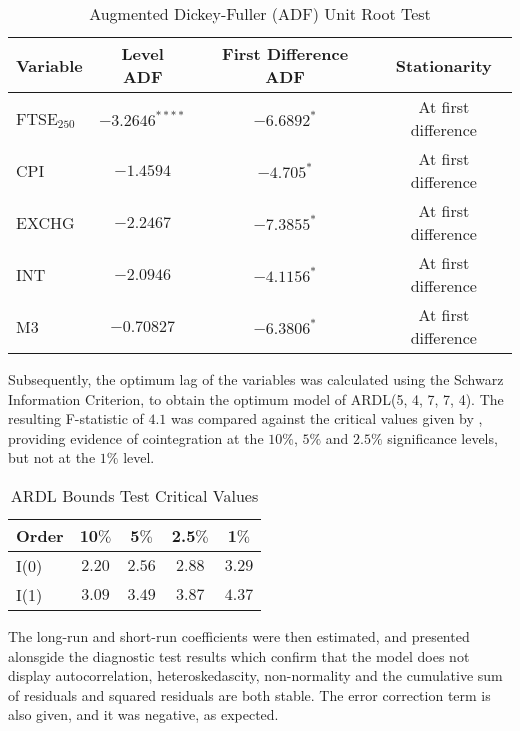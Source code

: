 \documentclass[11pt,a4paper]{article}
\newcommand{\citeboth}[1]{\citeauthor{#1} \citep{#1}}
\begin{document}
\begin{table}[h!]
    \centering
    \caption{Augmented Dickey-Fuller (ADF) Unit Root Test}
    \begin{tabular}{lccc}
        \toprule
        \textbf{Variable} & \textbf{Level ADF} & \textbf{First Difference ADF} & \textbf{Stationarity} \\
        \midrule
        FTSE$_{250}$ & $-3.2646^{****}$ & $-6.6892^{*}$ & At first difference \\
        CPI          & $-1.4594$ & $-4.705^{*}$ & At first difference \\
        EXCHG        & $-2.2467$ & $-7.3855^{*}$ & At first difference \\
        INT          & $-2.0946$ & $-4.1156^{*}$ & At first difference \\
        M3           & $-0.70827$ & $-6.3806^{*}$ & At first difference \\
        \bottomrule
    \end{tabular}
\end{table}


Subsequently, the optimum lag of the variables was calculated using the 
Schwarz Information Criterion, to obtain the optimum model 
of ARDL(5, 4, 7, 7, 4). The resulting F-statistic of $4.1$ was compared against the critical values
given by \citeboth{pesaran2001}, providing evidence of cointegration 
at the $10\%$, $5\%$ and $2.5\%$ significance levels, but not at the $1\%$ 
level.

\begin{table}[h!]
    \centering
    \caption{ARDL Bounds Test Critical Values}
    \begin{tabular}{lcccc}
        \toprule
        \textbf{Order} & \textbf{10$\%$} & \textbf{5$\%$} & \textbf{2.5$\%$} & \textbf{1$\%$} \\
        \midrule
        I(0) & $2.20$ & $2.56$ & $2.88$ & $3.29$ \\
        I(1) & $3.09$ & $3.49$ & $3.87$  & $4.37$ \\
        \bottomrule
    \end{tabular}
\end{table}

The long-run and short-run coefficients were then estimated, and presented 
alonsgide the diagnostic test results which confirm that the model does not
display autocorrelation, heteroskedascity, non-normality and the cumulative 
sum of residuals and squared residuals are both stable. The error
correction term is also given, and it was negative, as expected.
\end{document}
